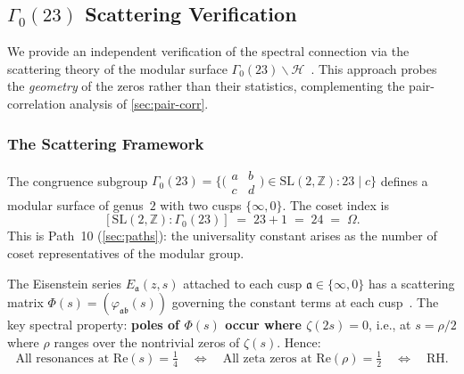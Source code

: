 \documentclass[11pt,a4paper]{article}
\theoremstyle{plain}
\theoremstyle{remark}
\renewcommand{\Omega}{\varOmega}
\newcommand{\Z}{\mathbb{Z}}
\begin{document}
\subsection{$\Gamma_0(23)$ Scattering Verification}
\label{sec:scattering}

We provide an independent verification of the spectral connection via the
scattering theory of the modular surface
$\Gamma_0(23)\backslash\mathcal{H}$~\cite{selberg1956,hejhal1976,iwaniec2002}.
This approach probes the \emph{geometry} of the zeros rather than their
statistics, complementing the pair-correlation analysis of
\cref{sec:pair-corr}.

\subsubsection{The Scattering Framework}
\label{sec:scattering-framework}

The congruence subgroup $\Gamma_0(23) = \bigl\{\bigl(\begin{smallmatrix}
a & b \\ c & d\end{smallmatrix}\bigr)\in\mathrm{SL}(2,\Z) : 23\mid c\bigr\}$
defines a modular surface of genus~$2$ with two cusps $\{\infty, 0\}$.
The coset index is
\begin{equation}\label{eq:coset-index}
  [\mathrm{SL}(2,\Z):\Gamma_0(23)] \;=\; 23 + 1 \;=\; 24 \;=\; \Omega.
\end{equation}
This is Path~10 (\cref{sec:paths}): the universality constant arises
as the number of coset representatives of the modular group.

The Eisenstein series $E_\mathfrak{a}(z,s)$ attached to each cusp
$\mathfrak{a}\in\{\infty,0\}$ has a scattering matrix
$\Phi(s) = (\varphi_{\mathfrak{a}\mathfrak{b}}(s))$ governing the
constant terms at each cusp~\cite{iwaniec2002}.  The key spectral
property: \textbf{poles of $\Phi(s)$ occur where $\zeta(2s)=0$}, i.e.,
at $s = \rho/2$ where $\rho$ ranges over the nontrivial zeros of
$\zeta(s)$.  Hence:
\[
  \text{All resonances at } \mathrm{Re}(s)=\tfrac{1}{4}
  \quad\Longleftrightarrow\quad
  \text{All zeta zeros at } \mathrm{Re}(\rho)=\tfrac{1}{2}
  \quad\Longleftrightarrow\quad
  \text{RH.}
\]
\end{document}
